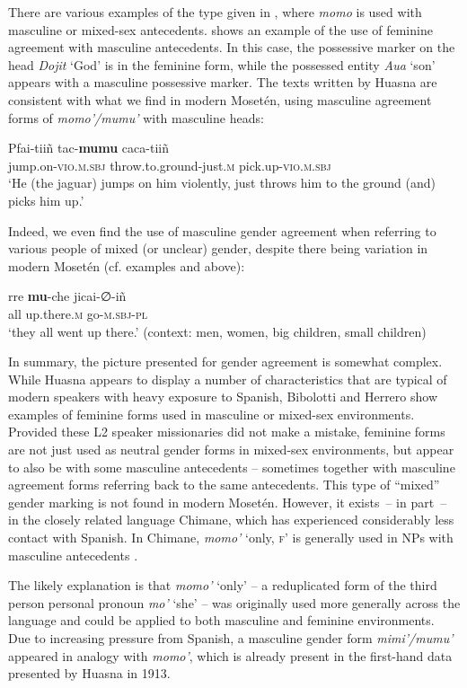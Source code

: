 \documentclass[output=paper,colorlinks,citecolor=brown
]{langscibook}
\begin{document}
There are various examples of the type given in , where \textit{momo} is used with masculine or mixed-sex antecedents.  shows an example of the use of feminine agreement with masculine antecedents. In this case, the possessive marker on the head \textit{Dojit} ‘God’ is in the feminine form, while the possessed entity \textit{Aua} ‘son’ appears with a masculine possessive marker.	
The texts written by Huasna are consistent with what we find in modern Mosetén, using masculine agreement forms of \textit{momo’/mumu’} with masculine heads:

\ea \label{sakel_example_12}
\gll Pfai-tiiñ		tac-\textbf{mumu}			caca-tiiñ\\
     jump.on-\textsc{vio.m.sbj}	throw.to.ground-just.\textsc{m}	pick.up-\textsc{vio.m.sbj}\\
\glt ‘He (the jaguar) jumps on him violently, just throws him to the ground (and) picks him up.’
\z	

Indeed, we even find the use of masculine gender agreement when referring to various people of mixed (or unclear) gender, despite there being variation in modern Mosetén (cf. examples  and  above):


\ea \label{sakel_example_13}
\gll rre	\textbf{mu}-che	jicai-∅-iñ\\
     all	up.there.\textsc{m}	go-\textsc{m.sbj-pl}\\
\glt ‘they all went up there.’ (context: men, women, big children, small children)
\z	

In summary, the picture presented for gender agreement is somewhat complex. While Huasna appears to display a number of characteristics that are typical of modern speakers with heavy exposure to Spanish, Bibolotti and Herrero show examples of feminine forms used in masculine or mixed-sex environments. 
Provided these L2 speaker missionaries did not make a mistake, feminine forms are not just used as neutral gender forms in mixed-sex environments, but appear to also be with some masculine antecedents – sometimes together with masculine agreement forms referring back to the same antecedents. This type of “mixed” gender marking is not found in modern Mosetén. However, it exists~– in part~– in the closely related language Chimane, which has experienced considerably less contact with Spanish. In Chimane, \textit{momo’} ‘only, \textsc{f}’ is generally used in NPs with masculine antecedents \citep{gill1999pedagogical}.

The likely explanation is that \textit{momo’} ‘only’ -- a reduplicated form of the third person personal pronoun \textit{mo’} ‘she’ -- was originally used more generally across the language and could be applied to both masculine and feminine environments. Due to increasing pressure from Spanish, a masculine gender form \textit{mimi’/mumu’} appeared in analogy with \textit{momo’}, which is already present in the first-hand data presented by Huasna in 1913.
\end{document}
